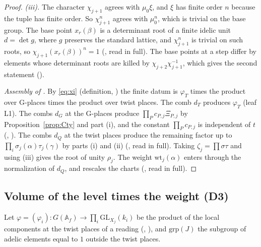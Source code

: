 \documentclass[11pt]{article}
\newcommand{\GL}{\mathrm{GL}}
\newcommand{\Af}{\mathbb A_{f}}
\theoremstyle{definition}
\theoremstyle{remark}
\begin{document}
\begin{proof}
\emph{(iii).} The character $\chi_{j+1}$ agrees with $\mu_0\xi$, and $\xi$ has finite order $n$ because the tuple has finite order. So $\chi_{j+1}^{n}$ agrees with $\mu_0^{n}$, which is trivial on the base group. The base point $x_r(\beta)$ is a determinant root of a finite idelic unit $d=\det g$, where $g$ preserves the standard lattice, and $\chi^{n}_{j+1}$ is trivial on such roots, so $\chi_{j+1}(x_r(\beta))^{n}=1$ (, read in full). The base points at a step differ by elements whose determinant roots are killed by $\chi_{j+2}\chi_{j+1}^{-1}$, which gives the second statement ().

\emph{Assembly of .} By \eqref{eq:xi} (definition, ) the finite datum is $\varphi_T$ times the product over G-places times the product over twist places. The comb $d_T$ produces $\varphi_T$ (leaf L1). The combs $d_G$ at the G-places produce $\prod_P c_{P,j}\Xi_{P,j}$ by Proposition~\ref{prop:Cty} and part (i), and the constant $\prod_P c_{P,j}$ is independent of $t$ (, ). The combs $d_Q$ at the twist places produce the remaining factor up to $\prod_i\sigma_j(\alpha)\tau_j(\gamma)$ by parts (i) and (ii) (, read in full). Taking $\zeta_j=\prod\sigma\tau$ and using (iii) gives the root of unity $\rho_j$. The weight $\mathrm{wt}_j(\alpha)$ enters through the normalization of $d_Q$, and  rescales the charts (, read in full).
\end{proof}

\subsection{Volume of the level times the weight (D3)}

Let $\varphi=(\varphi_i)\colon G(\Af)\to\prod_i\GL_{X_j}(k_i)$ be the product of the local components at the twist places of a reading (, ), and $\mathrm{grp}(J)$ the subgroup of adelic elements equal to $1$ outside the twist places.
\end{document}
